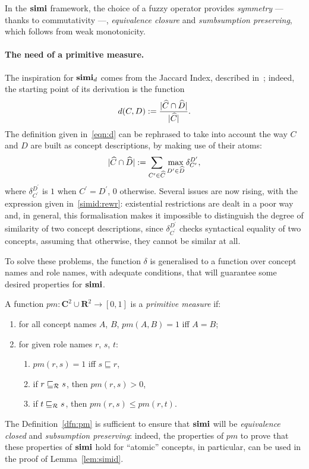 In the \(\mathbf{simi}{}\) framework, the choice of a fuzzy operator provides \emph{symmetry} --- thanks to commutativity ---, \emph{equivalence closure} and \emph{sumbsumption preserving}, which follows from weak monotonicity.

\paragraph{The need of a primitive measure.}
The inspiration for \(\mathbf{simi}_d\) comes from the Jaccard Index, described in~\cite{Ja01};
indeed, the starting point of its derivation is the function
\begin{equation}
  \label{eqn:d}
  d(C,D) :=
\frac{\lvert \widehat{C} \cap \widehat{D} \rvert}{\lvert \widehat{C} \rvert}.
\end{equation}
The definition given in~\eqref{eqn:d} can be rephrased to take into account the way \(C\) and \(D\) are built as concept descriptions, by making use of their atoms:
\begin{equation}
  \label{simid:rewr}
  \lvert \widehat{C} \cap \widehat{D} \rvert := \sum_{C^\prime \in \widehat{C}}\max_{D^\prime \in \widehat{D}}
                                  \delta_{C^\prime}^{D^\prime},
\end{equation}
where \(\delta_{C^\prime}^{D^\prime}\) is \(1\) when \(C^\prime = D^\prime\), \(0\) otherwise.
Several issues are now rising, with the expression given in~\eqref{simid:rewr}:
existential restrictions are dealt in a poor way and, in general, this formalisation makes it impossible to distinguish the degree of similarity of two concept descriptions, since \(\delta_{C^\prime}^{D^\prime}\) checks syntactical equality of two concepts, assuming that otherwise, they cannot be similar at all.

To solve these problems, the function \(\delta\) is generalised to a function over concept names and role names, with adequate conditions, that will guarantee some desired properties for \(\mathbf{simi}\).
\begin{definition}
  \label{dfn:pm}
  A function \(pm \colon \mathbf{C}^2 \cup \mathbf{R}^2 \to [0,1]\) is a \emph{primitive measure} if:
  \begin{enumerate}
    \item for all concept names \(A\), \(B\), \(pm(A,B) = 1\) iff \(A = B\);
    \item for given role names \(r\), \(s\), \(t\):
    \begin{enumerate}
      \item \(pm(r,s) = 1\) iff \(s \sqsubseteq r\),
      \item if \(r \sqsubseteq_{\mathcal{R}} s\), then \(pm(r,s) > 0\),
      \item if \(t \sqsubseteq_{\mathcal{R}} s\), then \(pm(r,s) \le pm(r,t)\).
    \end{enumerate}
  \end{enumerate}
\end{definition}
The Definition~\ref{dfn:pm} is sufficient to ensure that \(\mathbf{simi}\) will be \emph{equivalence closed} and \emph{subsumption preserving}: indeed, the properties of \(pm\) to prove that these properties of \(\mathbf{simi}\) hold for ``atomic'' concepts, in particular, can be used in the proof of Lemma~\ref{lem:simid}.

